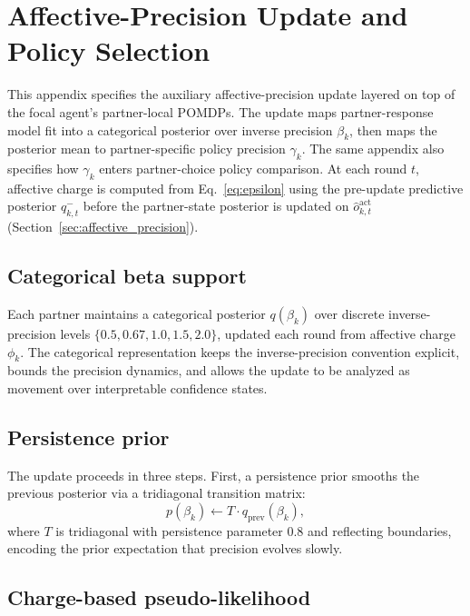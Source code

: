 \section{Affective-Precision Update and Policy Selection}
\label{app:affective_update}

This appendix specifies the auxiliary affective-precision update layered on top of the focal agent's partner-local POMDPs. The update maps partner-response model fit into a categorical posterior over inverse precision \(\beta_k\), then maps the posterior mean to partner-specific policy precision \(\gamma_k\). The same appendix also specifies how \(\gamma_k\) enters partner-choice policy comparison. At each round \(t\), affective charge is computed from Eq.~\eqref{eq:epsilon} using the pre-update predictive posterior \(q_{k,t}^-\) before the partner-state posterior is updated on \(\hat{o}_{k,t}^{\text{act}}\) (Section~\ref{sec:affective_precision}).

\subsection{Categorical beta support}

Each partner maintains a categorical posterior $q(\beta_k)$ over discrete inverse-precision levels $\{0.5, 0.67, 1.0, 1.5, 2.0\}$, updated each round from affective charge $\phi_k$. The categorical representation keeps the inverse-precision convention explicit, bounds the precision dynamics, and allows the update to be analyzed as movement over interpretable confidence states.

\subsection{Persistence prior}

The update proceeds in three steps. First, a persistence prior smooths the previous posterior via a tridiagonal transition matrix:
\begin{equation}
p(\beta_k) \leftarrow T \cdot q_{\text{prev}}(\beta_k),
\label{eq:persistence}
\end{equation}
where $T$ is tridiagonal with persistence parameter 0.8 and reflecting boundaries, encoding the prior expectation that precision evolves slowly.

\subsection{Charge-based pseudo-likelihood}

